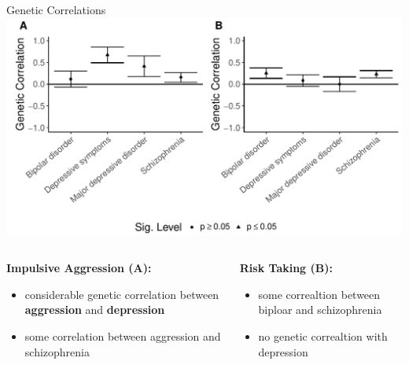 \documentclass{beamer}
\begin{document}
\begin{frame}[t]{Genetic Correlations}
  \includegraphics[width=0.8\linewidth]{../ukb_psychiatric/figures/combined_corr.pdf}
  \begin{columns}[T]
    \tiny
    \begin{column}[T]{0.5\textwidth}
      \textbf{Impulsive Aggression (A):}\\
      \begin{itemize}
        \item considerable genetic correlation between \textbf{aggression} and \textbf{depression}
        \item some correlation between aggression and schizophrenia
      \end{itemize}
    \end{column}
    \begin{column}[T]{0.5\textwidth}
      \textbf{Risk Taking (B):}\\
      \begin{itemize}
        \item some correaltion between biploar and schizophrenia
        \item no genetic correaltion with depression
      \end{itemize}
    \end{column}
  \end{columns}
\end{frame}
\end{document}

